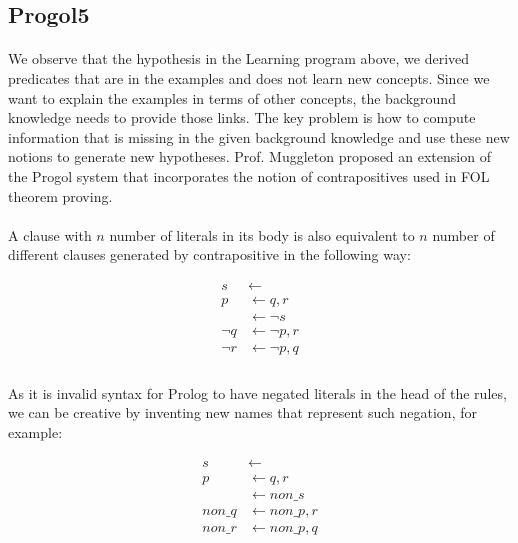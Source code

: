 \documentclass{article}
\theoremstyle{plain}
\theoremstyle{definition}
\begin{document}
\begin{multicols}{2}
\subsection{Progol5}

\paragraph{} We observe that the hypothesis in the Learning program above, we derived predicates that are in the examples and does not learn new concepts. Since we want to explain the examples in terms of other concepts, the background knowledge needs to provide those links. The key problem is how to compute information that is missing in the given background knowledge and use these new notions to generate new hypotheses. Prof. Muggleton proposed an extension of the Progol system that incorporates the notion of contrapositives used in FOL theorem proving\cite{muggleton00}.

\paragraph{} A clause with $n$ number of literals in its body is also equivalent to $n$ number of different clauses generated by contrapositive in the following way:

\begin{align*}
s &\leftarrow\\
p &\leftarrow q, r\\
&\leftarrow \lnot s\\
\lnot q &\leftarrow \lnot p, r\\
\lnot r &\leftarrow \lnot p, q\\
\end{align*}

\paragraph{} As it is invalid syntax for Prolog to have negated literals in the head of the rules, we can be creative by inventing new names that represent such negation, for example:

\begin{align*}
s &\leftarrow\\
p &\leftarrow q, r\\
&\leftarrow non\_s\\
non\_q &\leftarrow non\_p, r\\
non\_r &\leftarrow non\_p, q\\
\end{align*}


\end{multicols}
\end{document}
